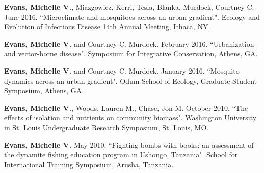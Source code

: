 
\begin{cvitems}
	\bigskip
	
	\item \textbf{Evans, Michelle V.}, Miazgowicz, Kerri, Tesla, Blanka, Murdock, Courtney C. June 2016. ``Microclimate and mosquitoes across an urban gradient". Ecology and Evolution of Infectious Disease 14th Annual Meeting, Ithaca, NY.
	
	\item \textbf{Evans, Michelle V.} and Courtney C. Murdock. February 2016. ``Urbanization and vector-borne disease". Symposium for Integrative Conservation, Athens, GA.
  
	\item \textbf{Evans, Michelle V.} and Courtney C. Murdock. January 2016. ``Mosquito dynamics across an urban gradient". Odum School of Ecology, Graduate Student Symposium, Athens, GA.

	\item \textbf{Evans, Michelle V.}, Woods, Lauren M., Chase, Jon M. October 2010. ``The effects of isolation and nutrients on community biomass". Washington University in St. Louis Undergraduate Research Symposium, St. Louis, MO.

	\item \textbf{Evans, Michelle V.} May 2010. ``Fighting bombs with books: an assessment of the dynamite fishing education program in Ushongo, Tanzania". School for International Training Symposium, Arusha, Tanzania.

	\bigskip
\end{cvitems}
